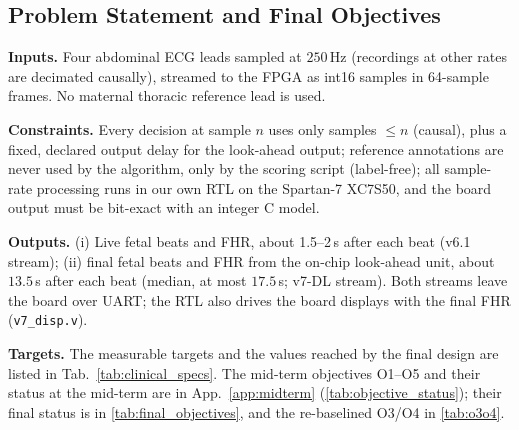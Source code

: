 \begin{finalpart}
\section{Problem Statement and Final Objectives}
\label{sec:problem_statement}
\noindent\textbf{Inputs.} Four abdominal ECG leads sampled at $250\,$Hz (recordings at other rates are decimated causally), streamed to the FPGA as int16 samples in 64-sample frames. No maternal thoracic reference lead is used.

\noindent\textbf{Constraints.} Every decision at sample $n$ uses only samples $\le n$ (causal), plus a fixed, declared output delay for the look-ahead output; reference annotations are never used by the algorithm, only by the scoring script (label-free); all sample-rate processing runs in our own RTL on the Spartan-7 XC7S50, and the board output must be bit-exact with an integer C model.

\noindent\textbf{Outputs.} (i) Live fetal beats and FHR, about 1.5--2\,s after each beat (v6.1 stream); (ii) final fetal beats and FHR from the on-chip look-ahead unit, about $13.5\,$s after each beat (median, at most $17.5\,$s; v7-DL stream). Both streams leave the board over UART; the RTL also drives the board displays with the final FHR (\texttt{v7\_disp.v}).

\noindent\textbf{Targets.} The measurable targets and the values reached by the final design are listed in Tab.~\ref{tab:clinical_specs}. The mid-term objectives O1--O5 and their status at the mid-term are in App.~\ref{app:midterm} (\cref{tab:objective_status}); their final status is in \cref{tab:final_objectives}, and the re-baselined O3/O4 in \cref{tab:o3o4}.
\end{finalpart}

